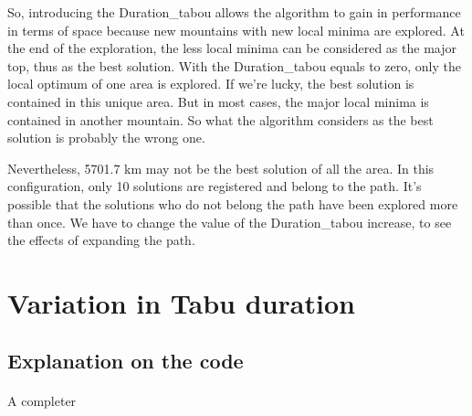 \documentclass[12pt,oneside,a4paper]{article}
\begin{document}
    So, introducing the Duration\_tabou allows the algorithm to gain in performance in terms of space because new mountains with new local minima are explored. At the end 
    of the exploration, the less local minima can be considered as the major top, thus as the best solution.
    With the Duration\_tabou equals to zero, only the local optimum of one area is explored. If we’re lucky, the best solution is contained in this unique area. But in most cases,
    the major local minima is contained in another mountain. So what the algorithm considers as the best solution is probably the wrong one.

    Nevertheless, 5701.7 km may not be the best solution of all the area. In this configuration, only 10 solutions are registered and belong to the path. It’s possible that
    the solutions who do not belong the path have been explored more than once. We have to change the value of the Duration\_tabou increase, to see the effects of 
    expanding the path.

\newpage
\section{Variation in Tabu duration}
\subsection{Explanation on the code}
\paragraph{}
    A completer
\end{document}
